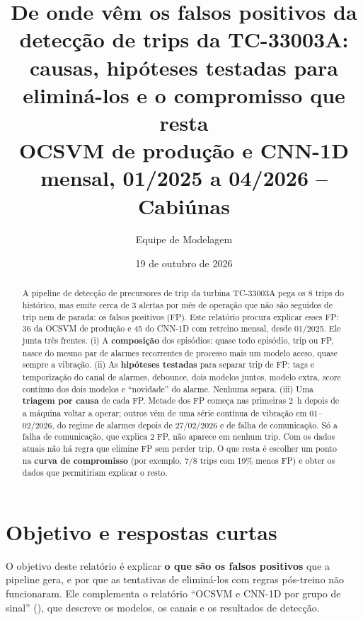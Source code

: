 \documentclass[11pt,a4paper]{article}
\title{De onde vêm os falsos positivos da detecção de trips da TC-33003A:\\
causas, hipóteses testadas para eliminá-los e o compromisso que resta\\
\large OCSVM de produção e CNN-1D mensal, 01/2025 a 04/2026 -- Cabiúnas}
\author{Equipe de Modelagem}
\date{19 de outubro de 2026}
\newcommand{\tg}[1]{\texttt{\detokenize{#1}}}
\begin{document}
\maketitle

\begin{abstract}
A pipeline de detecção de precursores de trip da turbina TC-33003A pega os 8 trips do histórico, mas emite cerca de
3 alertas por mês de operação que não são seguidos de trip nem de parada: os falsos positivos (FP). Este relatório
procura explicar esses FP: 36 da OCSVM de produção e 45 do CNN-1D com retreino mensal, desde 01/2025. Ele junta
três frentes. (i) A \textbf{composição} dos episódios: quase todo episódio, trip ou FP, nasce do mesmo par de alarmes
recorrentes de processo mais um modelo aceso, quase sempre a vibração. (ii) As \textbf{hipóteses testadas} para
separar trip de FP: tags e temporização do canal de alarmes, debounce, dois modelos juntos, modelo extra, score
contínuo dos dois modelos e ``novidade'' do alarme. Nenhuma separa. (iii) Uma \textbf{triagem por causa} de cada FP.
Metade dos FP começa nas primeiras 2~h depois de a máquina voltar a operar; outros vêm de uma série contínua de
vibração em 01--02/2026, do regime de alarmes depois de 27/02/2026 e de falha de comunicação. Só a falha de
comunicação, que explica 2 FP, não aparece em nenhum trip. Com os dados atuais não há regra que elimine FP sem perder
trip. O que resta é escolher um ponto na \textbf{curva de compromisso} (por exemplo, 7/8 trips com 19\% menos FP) e
obter os dados que permitiriam explicar o resto.
\end{abstract}

\tableofcontents
\newpage

\section{Objetivo e respostas curtas}

O objetivo deste relatório é explicar \textbf{o que são os falsos positivos} que a pipeline gera, e por que as
tentativas de eliminá-los com regras pós-treino não funcionaram. Ele complementa o relatório
``OCSVM e CNN-1D por grupo de sinal'' (\tg{relatorio_ocsvm_cnn1d_mensal/}), que descreve os modelos, os canais e os
resultados de detecção.
\end{document}
